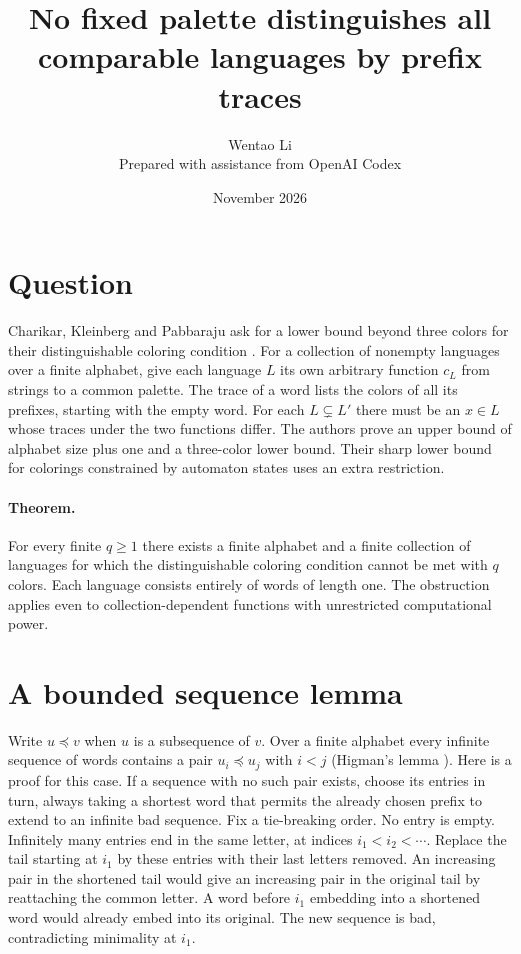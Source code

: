 \documentclass[11pt]{article}
\title{No fixed palette distinguishes all comparable languages by prefix traces}
\author{Wentao Li\\[2pt]\small Prepared with assistance from OpenAI Codex}
\date{November 2026}
\begin{document}
\maketitle
\section{Question}
Charikar, Kleinberg and Pabbaraju ask for a lower bound beyond three colors for their distinguishable coloring condition \cite[\S6]{ckp}. For a collection of nonempty languages over a finite alphabet, give each language $L$ its own arbitrary function $c_L$ from strings to a common palette. The trace of a word lists the colors of all its prefixes, starting with the empty word. For each $L\subsetneq L'$ there must be an $x\in L$ whose traces under the two functions differ. The authors prove an upper bound of alphabet size plus one and a three-color lower bound. Their sharp lower bound for colorings constrained by automaton states uses an extra restriction.

\paragraph{Theorem.} For every finite $q\ge1$ there exists a finite alphabet and a finite collection of languages for which the distinguishable coloring condition cannot be met with $q$ colors. Each language consists entirely of words of length one. The obstruction applies even to collection-dependent functions with unrestricted computational power.

\section{A bounded sequence lemma}
Write $u\preceq v$ when $u$ is a subsequence of $v$. Over a finite alphabet every infinite sequence of words contains a pair $u_i\preceq u_j$ with $i<j$ (Higman's lemma \cite{higman}). Here is a proof for this case. If a sequence with no such pair exists, choose its entries in turn, always taking a shortest word that permits the already chosen prefix to extend to an infinite bad sequence. Fix a tie-breaking order. No entry is empty. Infinitely many entries end in the same letter, at indices $i_1<i_2<\cdots$. Replace the tail starting at $i_1$ by these entries with their last letters removed. An increasing pair in the shortened tail would give an increasing pair in the original tail by reattaching the common letter. A word before $i_1$ embedding into a shortened word would already embed into its original. The new sequence is bad, contradicting minimality at $i_1$.
\end{document}
